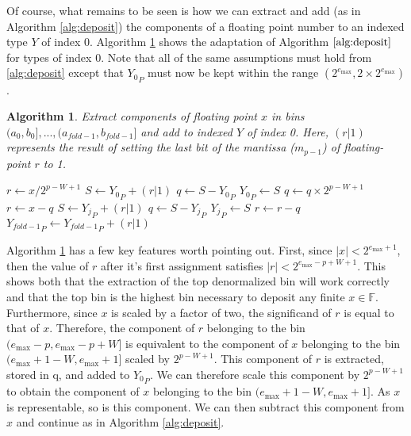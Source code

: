 \documentclass[12pt]{article}
\providecommand{\F}{\ensuremath{\mathbb{F}}}
\providecommand{\max}{\ensuremath{\text{max}}}
\theoremstyle{plain}
\newtheorem{alg}{Algorithm}[section]
\begin{document}
      Of course, what remains to be seen is how we can extract and add (as in Algorithm \ref{alg:deposit}) the components of a floating point number to an indexed type $Y$ of index 0. Algorithm \ref{alg:deposit0} shows the adaptation of Algorithm $\ref{alg:deposit}$ for types of index 0. Note that all of the same assumptions must hold from \ref{alg:deposit} except that ${Y_0}_P$ must now be kept within the range $(2^{e_{\max}}, 2 \times 2^{e_{\max}})$.
      \begin{alg}
        Extract components of floating point $x$ in bins $(a_0, b_0], ..., (a_{fold - 1}, b_{fold - 1}]$ and add to indexed $Y$ of index 0. Here, $(r | 1)$ represents the result of setting the last bit of the mantissa ($m_{p - 1}$) of floating-point $r$ to 1.
        \begin{algorithmic}
            \State $r \gets x / 2^{p - W + 1}$
            \State $S \gets {Y_0}_P + (r | 1)$
            \State $q \gets S - {Y_0}_P$
            \State ${Y_0}_P \gets S$
            \State $q \gets q \times 2^{p - W + 1}$
            \State $r \gets x - q$
              \State $S \gets {Y_j}_P + (r | 1)$
              \State $q \gets S - {Y_j}_P$
              \State ${Y_j}_P \gets S$
              \State $r \gets r - q$
            \EndFor
            \State ${Y_{fold - 1}}_P \gets {Y_{fold - 1}}_P + (r | 1)$
          \EndFunction
        \end{algorithmic}
        \label{alg:deposit0}
      \end{alg}

      Algorithm \ref{alg:deposit0} has a few key features worth pointing out. First, since $|x| < 2^{e_{\max} + 1}$, then the value of $r$ after it's first assignment satisfies $|r| < 2^{e_{\max} - p + W + 1}$. This shows both that the extraction of the top denormalized bin will work correctly and that the top bin is the highest bin necessary to deposit any finite $x \in \F$.
      Furthermore, since $x$ is scaled by a factor of two, the significand of $r$ is equal to that of $x$.
      Therefore, the component of $r$ belonging to the bin $(e_{\max} - p, e_{\max} - p + W]$ is equivalent to the component of $x$ belonging to the bin $(e_{\max} + 1 - W, e_{\max} + 1]$ scaled by $2^{p - W + 1}$. This component of $r$ is extracted, stored in q, and added to ${Y_0}_P$. We can therefore scale this component by $2^{p - W + 1}$ to obtain the component of $x$ belonging to the bin $(e_{\max} + 1 - W, e_{\max} + 1]$. As $x$ is representable, so is this component. We can then subtract this component from $x$ and continue as in Algorithm \ref{alg:deposit}.
\end{document}
